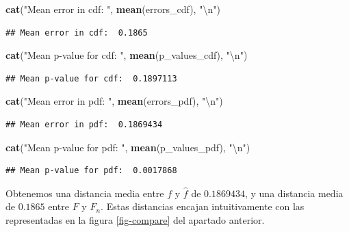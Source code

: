 \documentclass[a4paper]{article}
\newenvironment{Shaded}{\begin{snugshade}}{\end{snugshade}}
\newcommand{\CharTok}[1]{\textcolor[rgb]{0.31,0.60,0.02}{#1}}
\newcommand{\KeywordTok}[1]{\textcolor[rgb]{0.13,0.29,0.53}{\textbf{#1}}}
\newcommand{\NormalTok}[1]{#1}
\newcommand{\StringTok}[1]{\textcolor[rgb]{0.31,0.60,0.02}{#1}}
\begin{document}
\begin{enumerate}[a)]
\begin{Shaded}
\begin{Highlighting}[]
\KeywordTok{cat}\NormalTok{(}\StringTok{"Mean error in cdf: "}\NormalTok{, }\KeywordTok{mean}\NormalTok{(errors_cdf), }\StringTok{"}\CharTok{\textbackslash{}n}\StringTok{"}\NormalTok{)}
\end{Highlighting}
\end{Shaded}

\begin{verbatim}
## Mean error in cdf:  0.1865
\end{verbatim}

\begin{Shaded}
\begin{Highlighting}[]
\KeywordTok{cat}\NormalTok{(}\StringTok{"Mean p-value for cdf: "}\NormalTok{, }\KeywordTok{mean}\NormalTok{(p_values_cdf), }\StringTok{"}\CharTok{\textbackslash{}n}\StringTok{"}\NormalTok{)}
\end{Highlighting}
\end{Shaded}

\begin{verbatim}
## Mean p-value for cdf:  0.1897113
\end{verbatim}

\begin{Shaded}
\begin{Highlighting}[]
\KeywordTok{cat}\NormalTok{(}\StringTok{"Mean error in pdf: "}\NormalTok{, }\KeywordTok{mean}\NormalTok{(errors_pdf), }\StringTok{"}\CharTok{\textbackslash{}n}\StringTok{"}\NormalTok{)}
\end{Highlighting}
\end{Shaded}

\begin{verbatim}
## Mean error in pdf:  0.1869434
\end{verbatim}

\begin{Shaded}
\begin{Highlighting}[]
\KeywordTok{cat}\NormalTok{(}\StringTok{"Mean p-value for pdf: "}\NormalTok{, }\KeywordTok{mean}\NormalTok{(p_values_pdf), }\StringTok{"}\CharTok{\textbackslash{}n}\StringTok{"}\NormalTok{)}
\end{Highlighting}
\end{Shaded}

\begin{verbatim}
## Mean p-value for pdf:  0.0017868
\end{verbatim}

Obtenemos una distancia media entre $f$ y $\hat f$ de $0.1869434$, y una distancia media de $0.1865$ entre $F$ y $F_n$. Estas distancias encajan intuitivamente con las representadas en la figura \ref{fig-compare} del apartado anterior.


\end{enumerate}
\end{document}
